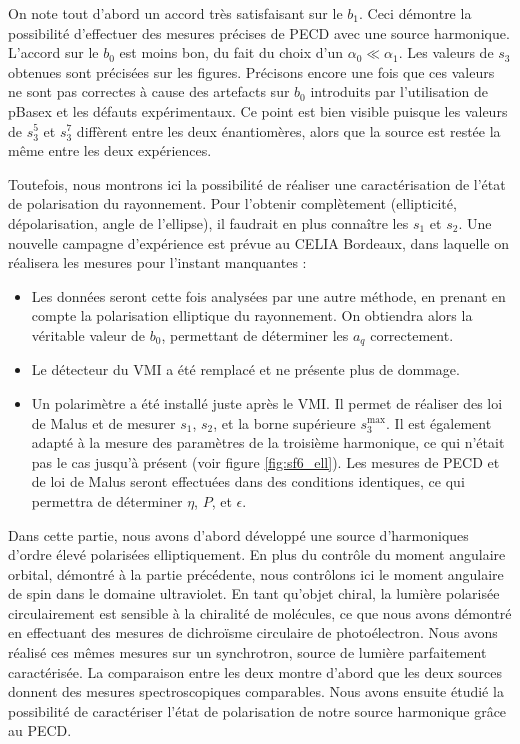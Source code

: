 On note tout d'abord un accord très satisfaisant sur le $b_1$. Ceci démontre la possibilité d'effectuer des mesures précises de PECD avec une source harmonique. L'accord sur le $b_0$ est moins bon, du fait du choix d'un $\alpha_0\ll\alpha_1$. Les valeurs de $s_3$ obtenues sont précisées sur les figures. Précisons encore une fois que ces valeurs ne sont pas correctes à cause des artefacts sur $b_0$ introduits par l'utilisation de pBasex et les défauts expérimentaux. Ce point est bien visible puisque les valeurs de $s_3^5$ et $s_3^7$ diffèrent entre les deux énantiomères, alors que la source est restée la même entre les deux expériences.\par
Toutefois, nous montrons ici la possibilité de réaliser une caractérisation de l'état de polarisation du rayonnement. Pour l'obtenir complètement (ellipticité, dépolarisation, angle de l'ellipse), il faudrait en plus connaître les $s_1$ et $s_2$. Une nouvelle campagne d'expérience est prévue au CELIA Bordeaux, dans laquelle on réalisera les mesures pour l'instant manquantes :


\begin{itemize}
\renewcommand{\labelitemi}{$\bullet$}
\setlength\itemsep{1em}
\item Les données seront cette fois analysées par une autre méthode, en prenant en compte la polarisation elliptique du rayonnement. On obtiendra alors la véritable valeur de $b_0$, permettant de déterminer les $a_q$ correctement.
\item Le détecteur du VMI a été remplacé et ne présente plus de dommage.
\item Un polarimètre a été installé juste après le VMI. Il permet de réaliser des loi de Malus et de mesurer $s_1$, $s_2$, et la borne supérieure $s_3^{\text{max}}$. Il est également adapté à la mesure des paramètres de la troisième harmonique, ce qui n'était pas le cas jusqu'à présent (voir figure \ref{fig:sf6_ell}). Les mesures de PECD et de loi de Malus seront effectuées dans des conditions identiques, ce qui permettra de déterminer $\eta$, $P$, et $\epsilon$. 
\end{itemize}

Dans cette partie, nous avons d'abord développé une source d'harmoniques d'ordre élevé polarisées elliptiquement. En plus du contrôle du moment angulaire orbital, démontré à la partie précédente, nous contrôlons ici le moment angulaire de spin dans le domaine ultraviolet. En tant qu'objet chiral, la lumière polarisée circulairement est sensible à la chiralité de molécules, ce que nous avons démontré en effectuant des mesures de dichroïsme circulaire de photoélectron. Nous avons réalisé ces mêmes mesures sur un synchrotron, source de lumière parfaitement caractérisée. La comparaison entre les deux montre d'abord que les deux sources donnent des mesures spectroscopiques comparables. Nous avons ensuite étudié la possibilité de caractériser l'état de polarisation de notre source harmonique grâce au PECD.

